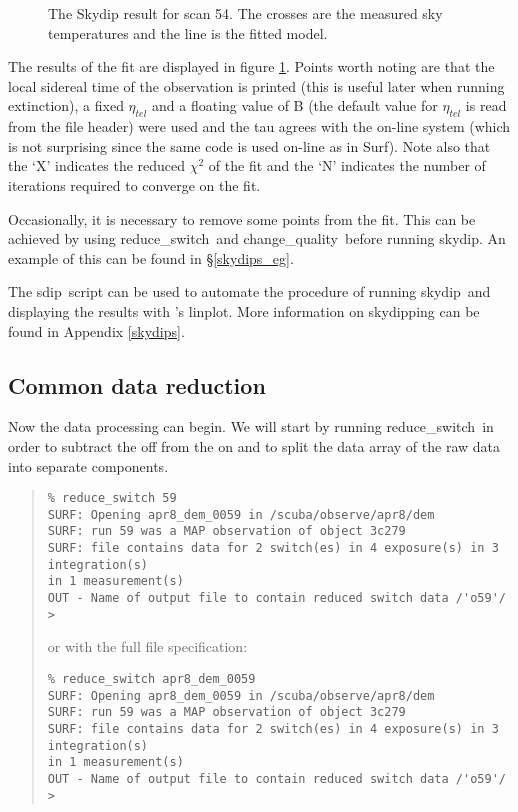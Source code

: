 \documentclass[twoside,11pt]{article}
\newcommand{\scusoft}          {{\sc Surf}}
\newcommand{\Kappa}{\xref{{\sc{Kappa}}}{sun95}{}}
\newcommand{\task}[1]{{\sf #1}}
\newcommand{\chgqual}{\htmlref{\task{change\_quality}}{CHANGE_QUALITY}}
\newcommand{\resw}{\htmlref{\task{reduce\_switch}}{REDUCE_SWITCH}}
\newcommand{\skydip}{\htmlref{\task{skydip}}{SKYDIP}}
\newcommand{\ext}{\htmlref{\task{extinction}}{EXTINCTION}}
\newcommand{\sdip}{\htmlref{\task{sdip}}{SDIP}}
\newcommand{\linplot}{\xref{\task{linplot}}{sun95}{LINPLOT}}
\newenvironment{myquote}{\begin{quote}\begin{small}}{\end{small}\end{quote}}
\newcommand{\htmlref}[2]{#1}
\newcommand{\xref}[3]{#1}
\begin{document}
\begin{figure}
\begin{center}
\caption{The Skydip result for scan 54. The crosses are the measured
sky temperatures and the line is the fitted model.}
\label{skyfig}
\end{center}
\end{figure}


The results of the fit are displayed in figure \ref{skyfig}. Points worth
noting are that the local sidereal time of the observation is printed (this is
useful later when running \ext), a fixed $\eta_{tel}$ and a floating value of
B (the default value for $\eta_{tel}$ is read from the file header) were used
and the tau agrees with the on-line system (which is not surprising since the
same code is used on-line as in \scusoft). Note also that the `X' indicates
the reduced $\chi^2$ of the fit and the `N' indicates the number of iterations
required to converge on the fit.

Occasionally, it is necessary to remove some points from the fit. This
can be achieved by using \resw\ and \chgqual\ before running \skydip.
An example of this can be found in \S\ref{skydips_eg}.


The \sdip\ script can be used to automate the procedure of running
\skydip\ and displaying the results with \Kappa's \linplot. More 
information on skydipping can be found in Appendix \ref{skydips}.

\subsection{Common data reduction}

Now the data processing can begin. We will start by running 
\resw\ in order to subtract the off from the on and to split the
data array of the raw data into separate components.

\begin{myquote}
\begin{verbatim}
% reduce_switch 59
SURF: Opening apr8_dem_0059 in /scuba/observe/apr8/dem
SURF: run 59 was a MAP observation of object 3c279
SURF: file contains data for 2 switch(es) in 4 exposure(s) in 3 integration(s)
in 1 measurement(s)
OUT - Name of output file to contain reduced switch data /'o59'/ > 
\end{verbatim}
or with the full file specification:
\begin{verbatim}
% reduce_switch apr8_dem_0059
SURF: Opening apr8_dem_0059 in /scuba/observe/apr8/dem
SURF: run 59 was a MAP observation of object 3c279
SURF: file contains data for 2 switch(es) in 4 exposure(s) in 3 integration(s)
in 1 measurement(s)
OUT - Name of output file to contain reduced switch data /'o59'/ > 
\end{verbatim}
\end{myquote}
\end{document}
